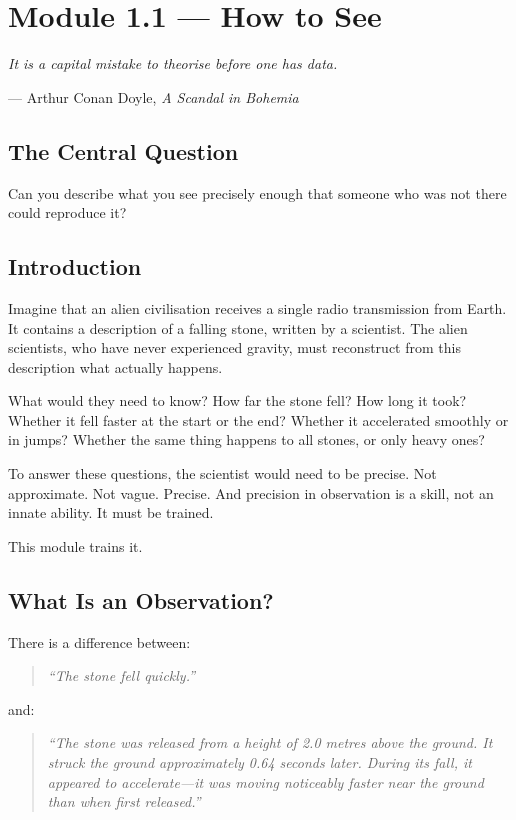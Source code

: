 \documentclass[12pt, a4paper, twoside]{book}
\theoremstyle{disc}
\begin{document}
\setcounter{chapter}{0}
\setcounter{section}{0}

\section{Module 1.1 — How to See}
\label{sec:how_to_see}

\epigraph{%
  \itshape It is a capital mistake to theorise before one has data.%
}{--- Arthur Conan Doyle, \textit{A Scandal in Bohemia}}

\subsection{The Central Question}

\begin{tcolorbox}[colback=deep!5, colframe=deep, fontupper=\large\bfseries\color{deep}]
Can you describe what you see precisely enough that someone who was not there could reproduce it?
\end{tcolorbox}

\subsection{Introduction}

Imagine that an alien civilisation receives a single radio transmission from Earth. It contains a description of a falling stone, written by a scientist. The alien scientists, who have never experienced gravity, must reconstruct from this description what actually happens.

What would they need to know? How far the stone fell? How long it took? Whether it fell faster at the start or the end? Whether it accelerated smoothly or in jumps? Whether the same thing happens to all stones, or only heavy ones?

To answer these questions, the scientist would need to be precise. Not approximate. Not vague. Precise. And precision in observation is a skill, not an innate ability. It must be trained.

This module trains it.

\subsection{What Is an Observation?}

There is a difference between:
\begin{quote}
\textit{``The stone fell quickly.''}
\end{quote}
and:
\begin{quote}
\textit{``The stone was released from a height of 2.0 metres above the ground. It struck the ground approximately 0.64 seconds later. During its fall, it appeared to accelerate---it was moving noticeably faster near the ground than when first released.''}
\end{quote}
\end{document}
